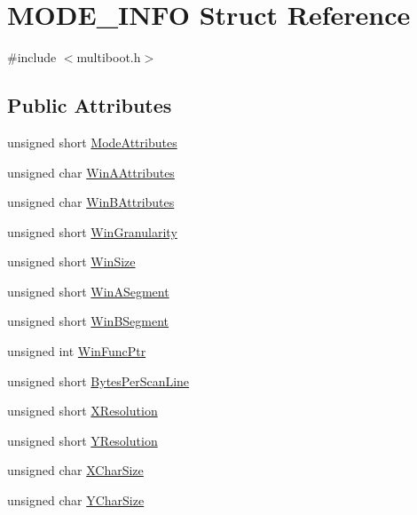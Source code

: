 \hypertarget{struct_m_o_d_e___i_n_f_o}{}\section{M\+O\+D\+E\+\_\+\+I\+N\+F\+O Struct Reference}
\label{struct_m_o_d_e___i_n_f_o}


{\ttfamily \#include $<$multiboot.\+h$>$}

\subsection*{Public Attributes}
\begin{DoxyCompactItemize}
\item 
unsigned short \hyperlink{struct_m_o_d_e___i_n_f_o_a8f384f7b253e7fba04691c9a7bf61869}{Mode\+Attributes}
\item 
unsigned char \hyperlink{struct_m_o_d_e___i_n_f_o_a13c07e34a389abb77442dc491768dac1}{Win\+A\+Attributes}
\item 
unsigned char \hyperlink{struct_m_o_d_e___i_n_f_o_aecd320d96b1d3c1a7d8f09bf53e58412}{Win\+B\+Attributes}
\item 
unsigned short \hyperlink{struct_m_o_d_e___i_n_f_o_a6658a56578f86970dbf739f9fe1bf350}{Win\+Granularity}
\item 
unsigned short \hyperlink{struct_m_o_d_e___i_n_f_o_ae04eca479fd10cabd9f46edd60763582}{Win\+Size}
\item 
unsigned short \hyperlink{struct_m_o_d_e___i_n_f_o_aaa187340991109b3d2b58ae161256b28}{Win\+A\+Segment}
\item 
unsigned short \hyperlink{struct_m_o_d_e___i_n_f_o_a38a1ba42efca8285b9134f4f47c89dc4}{Win\+B\+Segment}
\item 
unsigned int \hyperlink{struct_m_o_d_e___i_n_f_o_abe7570330397aef1564cd471329582fc}{Win\+Func\+Ptr}
\item 
unsigned short \hyperlink{struct_m_o_d_e___i_n_f_o_a7e836227c5d2ff4dc3bd7b90bdf1fb7b}{Bytes\+Per\+Scan\+Line}
\item 
unsigned short \hyperlink{struct_m_o_d_e___i_n_f_o_abb1600e71614364d0a752798da65a1d6}{X\+Resolution}
\item 
unsigned short \hyperlink{struct_m_o_d_e___i_n_f_o_aaa07c2ee372621e82b06376c83e718e0}{Y\+Resolution}
\item 
unsigned char \hyperlink{struct_m_o_d_e___i_n_f_o_ace02de2544b40e5c83f7e9fbebd418cc}{X\+Char\+Size}
\item 
unsigned char \hyperlink{struct_m_o_d_e___i_n_f_o_a818ddf6ff3ca5e5b45f76478f5813ac2}{Y\+Char\+Size}

\end{DoxyCompactItemize}
